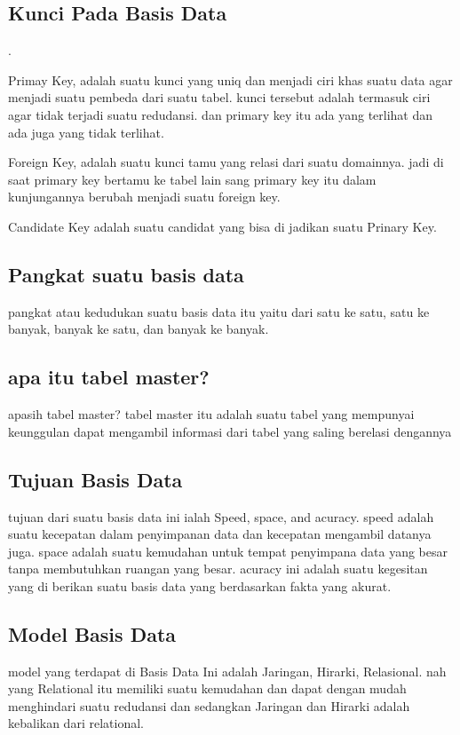 \documentclass[a4paper,12 pt]{article}
\begin{document}
\subsection{Kunci Pada Basis Data}.

			Primay Key, adalah suatu kunci yang uniq dan menjadi ciri khas suatu data agar menjadi suatu pembeda dari suatu tabel. kunci tersebut adalah termasuk ciri agar tidak terjadi suatu redudansi. dan primary key itu ada yang terlihat dan ada juga yang tidak terlihat.
	
	Foreign Key, adalah suatu kunci tamu yang relasi dari suatu domainnya. jadi di saat primary key bertamu ke tabel lain sang primary key itu dalam kunjungannya berubah menjadi suatu foreign key.
	
	Candidate Key adalah suatu candidat yang bisa di jadikan suatu Prinary Key.
\subsection{Pangkat suatu basis data}
pangkat atau kedudukan suatu basis data itu yaitu dari satu ke satu, satu ke banyak, banyak ke satu, dan banyak ke banyak.

\newpage
\subsection{apa itu tabel master?}
apasih tabel master? tabel master itu adalah suatu tabel yang mempunyai keunggulan dapat mengambil informasi dari tabel yang saling berelasi dengannya

\subsection{Tujuan Basis Data}
tujuan dari suatu basis data ini ialah Speed, space, and acuracy. speed adalah suatu kecepatan dalam penyimpanan data dan kecepatan mengambil datanya juga.
space adalah suatu kemudahan untuk tempat penyimpana data yang besar tanpa membutuhkan ruangan yang besar.
acuracy ini adalah suatu kegesitan yang di berikan suatu basis data yang berdasarkan fakta yang akurat.

\subsection{Model Basis Data}
model yang terdapat di Basis Data Ini adalah Jaringan, Hirarki, Relasional. nah yang Relational itu memiliki suatu kemudahan dan dapat dengan mudah menghindari suatu redudansi dan sedangkan Jaringan dan Hirarki adalah kebalikan dari relational.
\end{document}
